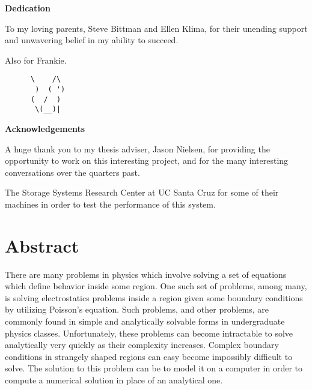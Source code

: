 \documentclass[12pt]{article}
\begin{document}
\begin{addmargin}[8em]{8em}
\begin{center}

	\textbf{Dedication}
	\vspace{50mm}

	To my loving parents, Steve Bittman and Ellen Klima, for their unending support
	and unwavering belief in my ability to succeed.

	\vspace{100mm}
	Also for Frankie.
\end{center}

\begin{addmargin}[6.2em]{8em}
\begin{verbatim}
      \    /\
       )  ( ')
      (  /  )
       \(__)|
\end{verbatim}
\end{addmargin}
\end{addmargin}
\clearpage
\begin{center}
	\textbf{Acknowledgements}
	\vspace{50mm}

	A huge thank you to my thesis adviser, Jason Nielsen, for providing the opportunity
	to work on this interesting project, and for the many interesting conversations over
	the quarters past.

	\vspace{10mm}
	The Storage Systems Research Center at UC Santa Cruz for some of their machines in order
	to test the performance of this system.

\end{center}
\clearpage
\tableofcontents
\clearpage
\listoffigures
\listoftables
\clearpage
\renewcommand{\lstlistlistingname}{List of Source Code Listings}
\lstlistoflistings
\clearpage

\renewcommand{\thepage}{\arabic{page}}
\setcounter{page}{1}
\section*{Abstract}

\onehalfspacing

There are many problems in physics which involve solving a set of equations which define behavior
inside some region. One such set of problems, among many, is solving electrostatics problems inside
a region given some boundary conditions by utilizing Poisson's equation. Such problems, and other
problems, are commonly found in simple and analytically solvable forms in undergraduate physics classes.
Unfortunately, these problems can become intractable to solve analytically very quickly as their complexity
increases. Complex boundary conditions in strangely shaped regions can easy become impossibly difficult to
solve. The solution to this problem can be to model it on a computer in order to compute a numerical solution
in place of an analytical one.
\end{document}
